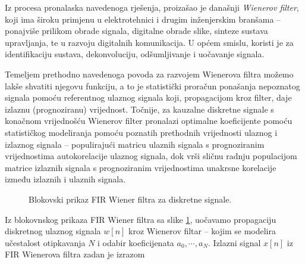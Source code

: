 \documentclass[a4paper,12pt,oneside]{memoir}
\begin{document}
            Iz procesa pronalaska navedenoga rješenja, proizašao je današnji \textit{Wienerov filter}, koji ima široku primjenu u elektrotehnici i drugim inženjerskim branšama -- ponajviše prilikom obrade signala, digitalne obrade slike, sinteze sustava upravljanja, te u razvoju digitalnih komunikacija. U općem smislu, koristi je za identifikaciju sustava, dekonvoluciju, odšumljivanje i uočavanje signala.

            Temeljem prethodno navedenoga povoda za razvojem Wienerova filtra možemo lakše shvatiti njegovu funkciju, a to je statistički proračun ponašanja nepoznatog signala pomoću referentnog ulaznog signala koji, propagacijom kroz filter, daje izlaznu (prognoziranu) vrijednost. Točnije, za kauzalne diskretne signale s konačnom vrijednošću Wienerov filter pronalazi optimalne koeficijente pomoću statističkog modeliranja pomoću poznatih prethodnih vrijednosti ulaznog i izlaznog signala -- populirajući matricu ulaznih signala s prognoziranim vrijednostima autokorelacije ulaznog signala, dok vrši sličnu radnju populacijom matrice izlaznih signala s prognoziranim vrijednostima unakrsne korelacije između izlaznih i ulaznih signala.

            \begin{figure}[H]
                \centering
                \caption{Blokovski prikaz FIR Wiener filtra za diskretne signale.}
                \label{fig:U5}
            \end{figure}
            Iz blokovnskog prikaza FIR Wiener filtra sa slike \ref{fig:U5}, uočavamo propagaciju diskretnog ulaznog signala $w[n]$ kroz Wienerov filtar -- kojim se modelira učestalost otipkavanja $N$ i odabir koeficijenata ${a_0,\dotsm,a_N}$. Izlazni signal $x[n]$ iz FIR Wienerova filtra zadan je izrazom
\end{document}
